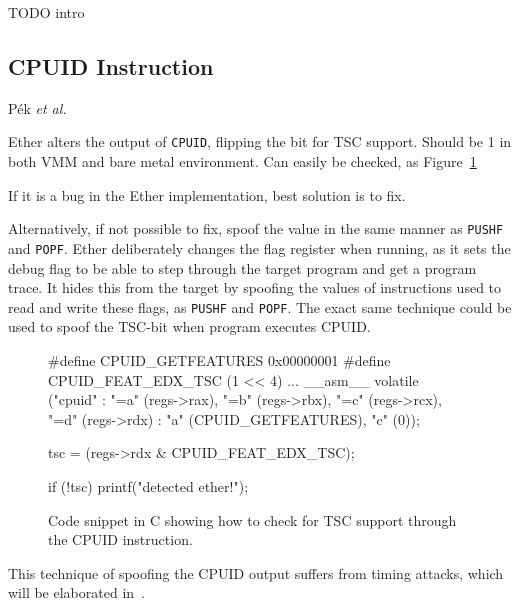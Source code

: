 TODO intro


\subsection{CPUID Instruction}
\label{sec:approach-cpuid}


P{\'e}k {\em et al.}~\cite{nether}

Ether alters the output of {\tt CPUID}, flipping the bit for TSC support. Should
be 1 in both VMM and bare metal environment. Can easily be checked, as
Figure~\ref{fig:cpuid-tsc}

If it is a bug in the Ether implementation, best solution is to fix.

Alternatively, if not possible to fix, spoof the value in the same manner as
{\tt PUSHF} and {\tt POPF}. Ether deliberately changes the flag register when
running, as it sets the debug flag to be able to step through the target program
and get a program trace. It hides this from the target by spoofing the values of
instructions used to read and write these flags, as {\tt PUSHF} and {\tt POPF}.
The exact same technique could be used to spoof the TSC-bit when program
executes CPUID.

\begin{figure}[h]
\begin{lstc}
#define CPUID_GETFEATURES 0x00000001
#define CPUID_FEAT_EDX_TSC (1 << 4)
...
__asm__ volatile ("cpuid" :
    "=a" (regs->rax),
    "=b" (regs->rbx),
    "=c" (regs->rcx),
    "=d" (regs->rdx)
    : "a" (CPUID_GETFEATURES), "c" (0));

tsc  = (regs->rdx & CPUID_FEAT_EDX_TSC);

if (!tsc) printf("detected ether!\n");
\end{lstc}
\caption{\label{fig:cpuid-tsc} Code snippet in C showing how to check for TSC
  support through the CPUID instruction.}
\end{figure}

This technique of spoofing the CPUID output suffers from timing attacks, which
will be elaborated in~.


